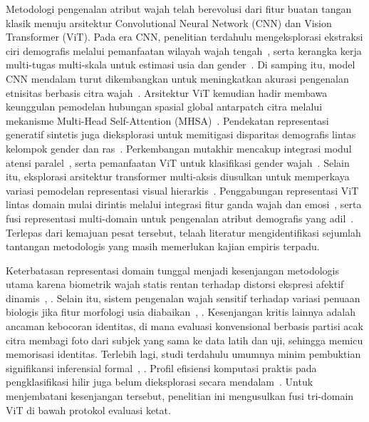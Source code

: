 Metodologi pengenalan atribut wajah telah berevolusi dari fitur buatan tangan klasik menuju arsitektur Convolutional Neural Network (CNN) dan Vision Transformer (ViT). Pada era CNN, penelitian terdahulu mengeksplorasi ekstraksi ciri demografis melalui pemanfaatan wilayah wajah tengah~\cite{ref11}, serta kerangka kerja multi-tugas multi-skala untuk estimasi usia dan gender~\cite{ref12}. Di samping itu, model CNN mendalam turut dikembangkan untuk meningkatkan akurasi pengenalan etnisitas berbasis citra wajah~\cite{ref13}. Arsitektur ViT kemudian hadir membawa keunggulan pemodelan hubungan spasial global antarpatch citra melalui mekanisme Multi-Head Self-Attention (MHSA)~\cite{ref14}. Pendekatan representasi generatif sintetis juga dieksplorasi untuk memitigasi disparitas demografis lintas kelompok gender dan ras~\cite{ref15}. Perkembangan mutakhir mencakup integrasi modul atensi paralel~\cite{ref16}, serta pemanfaatan ViT untuk klasifikasi gender wajah~\cite{ref17}. Selain itu, eksplorasi arsitektur transformer multi-aksis diusulkan untuk memperkaya variasi pemodelan representasi visual hierarkis~\cite{ref18}. Penggabungan representasi ViT lintas domain mulai dirintis melalui integrasi fitur ganda wajah dan emosi~\cite{ref19}, serta fusi representasi multi-domain untuk pengenalan atribut demografis yang adil~\cite{ref20}. Terlepas dari kemajuan pesat tersebut, telaah literatur mengidentifikasi sejumlah tantangan metodologis yang masih memerlukan kajian empiris terpadu.

Keterbatasan representasi domain tunggal menjadi kesenjangan metodologis utama karena biometrik wajah statis rentan terhadap distorsi ekspresi afektif dinamis~\cite{ref11}, \cite{ref17}. Selain itu, sistem pengenalan wajah sensitif terhadap variasi penuaan biologis jika fitur morfologi usia diabaikan~\cite{ref12}, \cite{ref18}. Kesenjangan kritis lainnya adalah ancaman kebocoran identitas, di mana evaluasi konvensional berbasis partisi acak citra membagi foto dari subjek yang sama ke data latih dan uji, sehingga memicu memorisasi identitas. Terlebih lagi, studi terdahulu umumnya minim pembuktian signifikansi inferensial formal~\cite{ref13}, \cite{ref19}. Profil efisiensi komputasi praktis pada pengklasifikasi hilir juga belum dieksplorasi secara mendalam~\cite{ref20}. Untuk menjembatani kesenjangan tersebut, penelitian ini mengusulkan fusi tri-domain ViT di bawah protokol evaluasi ketat.

